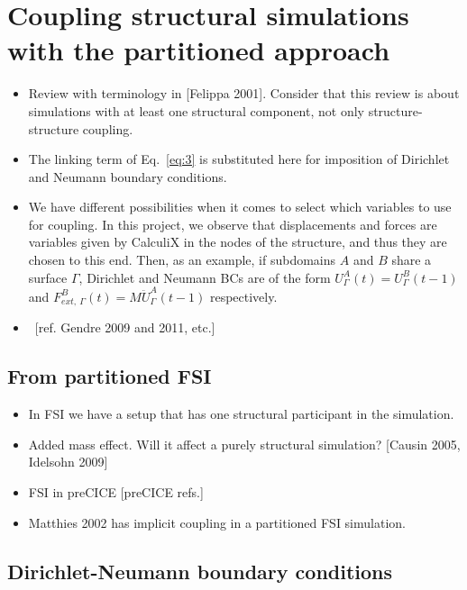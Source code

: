 \documentclass[a4paper, 11pt, oneside]{Thesis}  %
\begin{document}
    \section{Coupling structural simulations with the partitioned approach}
        
        \begin{itemize}
            \item Review with terminology in [Felippa 2001]. Consider that this review is about simulations with at least one structural component, not only structure-structure coupling.
            \item The linking term of Eq.~\ref{eq:3} is substituted here for imposition of Dirichlet and Neumann boundary conditions. 
            \item We have different possibilities when it comes to select which variables to use for coupling. In this project, we observe that displacements and forces are variables given by CalculiX in the nodes of the structure, and thus they are chosen to this end. Then, as an example, if subdomains $A$ and $B$ share a surface $\Gamma$, Dirichlet and Neumann BCs are of the form $U_{\Gamma}^A (t)= U_{\Gamma}^B (t-1)$ and $F_{ext,~\Gamma}^B (t) = M\ddot{U}_{\Gamma}^A (t-1)$ respectively.
            \item ~[ref. Gendre 2009 and 2011, etc.]
        \end{itemize}
            
        \subsection{From partitioned FSI}
            \begin{itemize}
                \item In FSI we have a setup that has one structural participant in the simulation.
                \item Added mass effect. Will it affect a purely structural simulation? [Causin 2005, Idelsohn 2009]
                \item FSI in preCICE [preCICE refs.]
                \item Matthies 2002 has implicit coupling in a partitioned FSI simulation.
            \end{itemize}
                
        \subsection{Dirichlet-Neumann boundary conditions}
            
\end{document}
